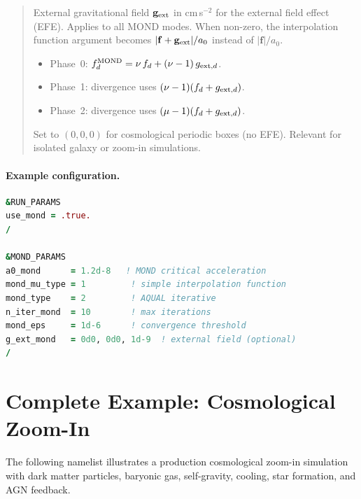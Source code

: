 \begin{quote}
External gravitational field $\mathbf{g}_{\rm ext}$ in cm\,s$^{-2}$
for the external field effect (EFE).  Applies to all MOND modes.
When non-zero, the interpolation function argument becomes
$|\mathbf{f} + \mathbf{g}_{\rm ext}|/a_0$ instead of
$|\mathbf{f}|/a_0$.

\begin{itemize}
\item Phase~0: $f_d^{\rm MOND} = \nu\,f_d + (\nu-1)\,g_{{\rm ext},d}$.
\item Phase~1: divergence uses $(\nu-1)(f_d + g_{{\rm ext},d})$.
\item Phase~2: divergence uses $(\mu-1)(f_d + g_{{\rm ext},d})$.
\end{itemize}

Set to $(0,0,0)$ for cosmological periodic boxes (no EFE).
Relevant for isolated galaxy or zoom-in simulations.
\end{quote}

\paragraph{Example configuration.}
\begin{lstlisting}[language=Fortran]
&RUN_PARAMS
use_mond = .true.
/

&MOND_PARAMS
a0_mond      = 1.2d-8   ! MOND critical acceleration
mond_mu_type = 1         ! simple interpolation function
mond_type    = 2         ! AQUAL iterative
n_iter_mond  = 10        ! max iterations
mond_eps     = 1d-6      ! convergence threshold
g_ext_mond   = 0d0, 0d0, 1d-9  ! external field (optional)
/
\end{lstlisting}


\section{Complete Example: Cosmological Zoom-In}
\label{sec:example}

The following namelist illustrates a production cosmological zoom-in
simulation with dark matter particles, baryonic gas, self-gravity,
cooling, star formation, and AGN feedback.

